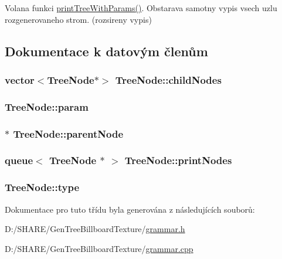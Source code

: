 \label{class_tree_node_a2edb10371f21391d0fd5140a78587851}
Volana funkci \hyperlink{class_tree_node_a48aa6a3483d2046fcdffe51d1c23714a}{printTreeWithParams()}. Obstarava samotny vypis vsech uzlu rozgenerovaneho strom. (rozsireny vypis) 

\subsection{Dokumentace k datovým členům}
\hypertarget{class_tree_node_a348136639185d4a6863c01229843fe5f}{
\subsubsection[{childNodes}]{\setlength{\rightskip}{0pt plus 5cm}vector$<${\bf TreeNode}$\ast$$>$ {\bf TreeNode::childNodes}}}
\label{class_tree_node_a348136639185d4a6863c01229843fe5f}
\hypertarget{class_tree_node_a984e95b48f62382300e2180da17d1cb9}{
\subsubsection[{param}]{ {\bf TreeNode::param}}}
\label{class_tree_node_a984e95b48f62382300e2180da17d1cb9}
\hypertarget{class_tree_node_a30ca20ef8f51fe101b20b10b3265ef0d}{
\subsubsection[{parentNode}]{$\ast$ {\bf TreeNode::parentNode}}}
\label{class_tree_node_a30ca20ef8f51fe101b20b10b3265ef0d}
\hypertarget{class_tree_node_a3726e004a9259119da621342a0adad37}{
\subsubsection[{printNodes}]{\setlength{\rightskip}{0pt plus 5cm}queue$<$ {\bf TreeNode} $\ast$ $>$ {\bf TreeNode::printNodes}}}
\label{class_tree_node_a3726e004a9259119da621342a0adad37}
\hypertarget{class_tree_node_abdd5d246de62fe64cf3b76177969fd2c}{
\subsubsection[{type}]{ {\bf TreeNode::type}}}
\label{class_tree_node_abdd5d246de62fe64cf3b76177969fd2c}


Dokumentace pro tuto třídu byla generována z následujících souborů:\begin{DoxyCompactItemize}
\item 
D:/SHARE/GenTreeBillboardTexture/\hyperlink{grammar_8h}{grammar.h}\item 
D:/SHARE/GenTreeBillboardTexture/\hyperlink{grammar_8cpp}{grammar.cpp}\end{DoxyCompactItemize}
